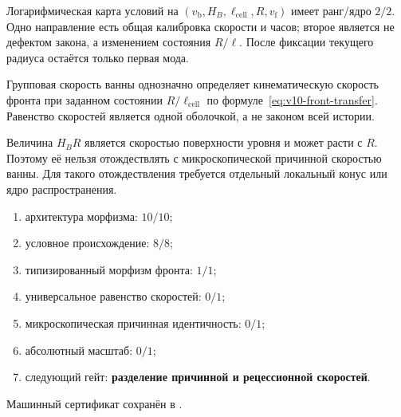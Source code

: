 Логарифмическая карта условий на
$(v_{\mathrm b},H_B,\ell_{\mathrm{cell}},R,v_{\mathrm f})$ имеет
ранг/ядро $2/2$. Одно направление есть общая калибровка скорости и часов;
второе является не дефектом закона, а изменением состояния $R/\ell$. После
фиксации текущего радиуса остаётся только первая мода.

\begin{theorem}
Групповая скорость ванны однозначно определяет кинематическую скорость
фронта при заданном состоянии $R/\ell_{\mathrm{cell}}$ по
формуле~\eqref{eq:v10-front-transfer}. Равенство скоростей является одной
оболочкой, а не законом всей истории.
\end{theorem}

\begin{nogocriterion}
Величина $H_BR$ является скоростью поверхности уровня и может расти с $R$.
Поэтому её нельзя отождествлять с микроскопической причинной скоростью ванны.
Для такого отождествления требуется отдельный локальный конус или ядро
распространения.
\end{nogocriterion}

\begin{protocol}\begin{enumerate}
\item архитектура морфизма: \textbf{$10/10$};
\item условное происхождение: \textbf{$8/8$};
\item типизированный морфизм фронта: \textbf{$1/1$};
\item универсальное равенство скоростей: \textbf{$0/1$};
\item микроскопическая причинная идентичность: \textbf{$0/1$};
\item абсолютный масштаб: \textbf{$0/1$};
\item следующий гейт: \textbf{разделение причинной и рецессионной скоростей}.
\end{enumerate}\end{protocol}

Машинный сертификат сохранён в
.
